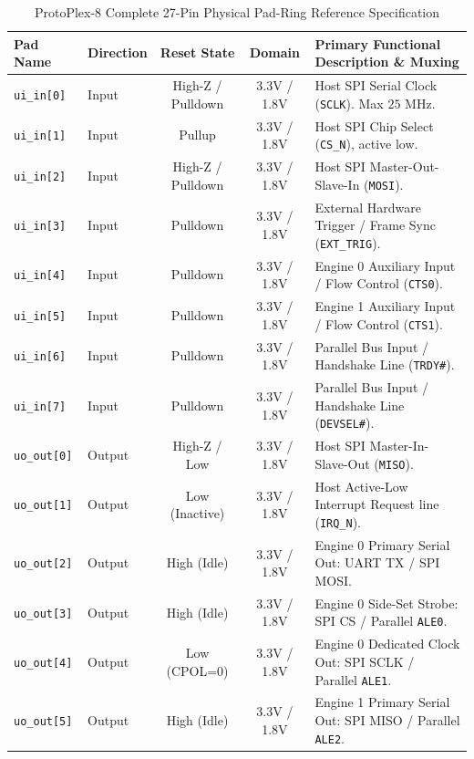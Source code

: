\documentclass[11pt,a4paper]{article}
\begin{document}
\begin{table}[htbp]
\centering
\caption{ProtoPlex-8 Complete 27-Pin Physical Pad-Ring Reference Specification}
\label{tab:pinout_reference}
\small
\begin{tabularx}{\textwidth}{llccX}
\toprule
\textbf{Pad Name} & \textbf{Direction} & \textbf{Reset State} & \textbf{Domain} & \textbf{Primary Functional Description \& Muxing} \\
\midrule
\texttt{ui\_in[0]} & Input  & High-Z / Pulldown & 3.3V / 1.8V & Host SPI Serial Clock (\texttt{SCLK}). Max $25\text{ MHz}$. \\
\texttt{ui\_in[1]} & Input  & Pullup            & 3.3V / 1.8V & Host SPI Chip Select (\texttt{CS\_N}), active low. \\
\texttt{ui\_in[2]} & Input  & High-Z / Pulldown & 3.3V / 1.8V & Host SPI Master-Out-Slave-In (\texttt{MOSI}). \\
\texttt{ui\_in[3]} & Input  & Pulldown          & 3.3V / 1.8V & External Hardware Trigger / Frame Sync (\texttt{EXT\_TRIG}). \\
\texttt{ui\_in[4]} & Input  & Pulldown          & 3.3V / 1.8V & Engine 0 Auxiliary Input / Flow Control (\texttt{CTS0}). \\
\texttt{ui\_in[5]} & Input  & Pulldown          & 3.3V / 1.8V & Engine 1 Auxiliary Input / Flow Control (\texttt{CTS1}). \\
\texttt{ui\_in[6]} & Input  & Pulldown          & 3.3V / 1.8V & Parallel Bus Input / Handshake Line (\texttt{TRDY\#}). \\
\texttt{ui\_in[7]} & Input  & Pulldown          & 3.3V / 1.8V & Parallel Bus Input / Handshake Line (\texttt{DEVSEL\#}). \\
\midrule
\texttt{uo\_out[0]} & Output & High-Z / Low     & 3.3V / 1.8V & Host SPI Master-In-Slave-Out (\texttt{MISO}). \\
\texttt{uo\_out[1]} & Output & Low (Inactive)   & 3.3V / 1.8V & Host Active-Low Interrupt Request line (\texttt{IRQ\_N}). \\
\texttt{uo\_out[2]} & Output & High (Idle)      & 3.3V / 1.8V & Engine 0 Primary Serial Out: UART TX / SPI MOSI. \\
\texttt{uo\_out[3]} & Output & High (Idle)      & 3.3V / 1.8V & Engine 0 Side-Set Strobe: SPI CS / Parallel \texttt{ALE0}. \\
\texttt{uo\_out[4]} & Output & Low (CPOL=0)     & 3.3V / 1.8V & Engine 0 Dedicated Clock Out: SPI SCLK / Parallel \texttt{ALE1}. \\
\texttt{uo\_out[5]} & Output & High (Idle)      & 3.3V / 1.8V & Engine 1 Primary Serial Out: SPI MISO / Parallel \texttt{ALE2}. \\

\end{tabularx}
\end{table}
\end{document}
